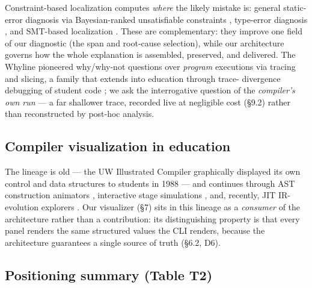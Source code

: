 Constraint-based localization computes \emph{where} the likely mistake
is: general static-error diagnosis via Bayesian-ranked unsatisfiable
constraints \cite{zhang2014general,zhang2017sherrloc}, type-error diagnosis \cite{zhang2015diagnosing}, and SMT-based
localization \cite{pavlinovic2015smt}. These are complementary: they improve one field
of our diagnostic (the span and root-cause selection), while our
architecture governs how the whole explanation is assembled,
preserved, and delivered. The Whyline \cite{ko2008debugging,ko2010extracting} pioneered
why/why-not questions over \emph{program} executions via tracing and
slicing, a family that extends into education through trace-
divergence debugging of student code \cite{suzuki2017tracediff}; we ask the interrogative
question of the \emph{compiler's own run} --- a far shallower trace,
recorded live at negligible cost (\S9.2) rather than reconstructed by
post-hoc analysis.

\subsection{Compiler visualization in education}

The lineage is old --- the UW Illustrated Compiler graphically
displayed its own control and data structures to students in 1988
\cite{andrews1988uw} --- and continues through AST construction animators \cite{almeida2008vast},
interactive stage simulations \cite{rodriguez2013simulations}, and, recently, JIT IR-evolution
explorers \cite{dalbo2025jitscope}. Our visualizer (\S7)
sits in this lineage as a \emph{consumer} of the architecture rather than
a contribution: its distinguishing property is that every panel
renders the same structured values the CLI renders, because the
architecture guarantees a single source of truth (\S6.2, D6).

\subsection{Positioning summary (Table T2)}

